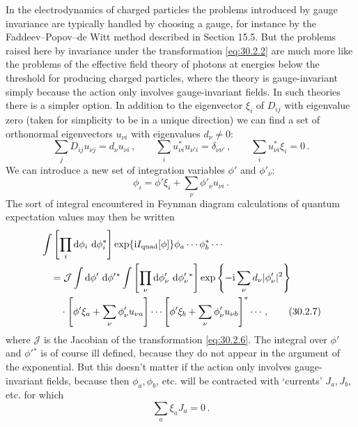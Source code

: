 In the electrodynamics of charged particles the problems introduced by gauge
invariance are typically handled by choosing a gauge, for instance by the
Faddeev--Popov--de Witt method described in Section 15.5. But the problems
raised here by invariance under the transformation \eqref{eq:30.2.2} are much
more like the problems of the effective field theory of photons at energies
below the threshold for producing charged particles, where the theory is
gauge-invariant simply because the action only involves gauge-invariant
fields. In such theories there is a simpler option. In addition to the
eigenvector \(\xi_i\) of \(D_{ij}\) with eigenvalue zero (taken for simplicity
to be in a unique direction) we can find a set of orthonormal eigenvectors
\(u_{\nu i}\) with eigenvalues \(d_\nu\neq0\):
\begin{equation}
  \sum_jD_{ij}u_{\nu j}=d_\nu u_{\nu i}\,,
  \qquad
  \sum_i u_{\nu i}^*u_{\nu'i}=\delta_{\nu\nu'}\,,
  \qquad
  \sum_i u_{\nu i}^*\xi_i=0\,.
  \tag{30.2.5}\label{eq:30.2.5}
\end{equation}
We can introduce a new set of integration variables \(\phi'\) and
\(\phi'_\nu\):
\begin{equation}
  \phi_i=\phi'\xi_i+\sum_\nu\phi'_\nu u_{\nu i}\,.
  \tag{30.2.6}\label{eq:30.2.6}
\end{equation}
The sort of integral encountered in Feynman diagram calculations of quantum
expectation values may then be written
\begin{align}
  &\int\left[\prod_i \mathop{}\!\mathrm{d}\phi_i\,\mathop{}\!\mathrm{d}\phi_i^*\right]
    \exp\{\mathrm{i} I_{\mathrm{quad}}[\phi]\}
    \phi_a\cdots\phi_b^*\cdots
  \notag\\
  &\quad={}
    \mathcal{J}\int \mathop{}\!\mathrm{d}\phi'\,\mathop{}\!\mathrm{d}\phi'{}^*
    \int\left[\prod_\nu \mathop{}\!\mathrm{d}\phi'_\nu\,\mathop{}\!\mathrm{d}\phi_\nu'{}^*\right]
    \exp\left\{-\mathrm{i}\sum_\nu d_\nu|\phi'_\nu|^2\right\}
  \notag\\
  &\qquad\cdot
    \left[\phi'\xi_a+\sum_\nu\phi'_\nu u_{\nu a}\right]\cdots
    \left[\phi'\xi_b+\sum_\nu\phi'_\nu u_{\nu b}\right]^*\cdots\,,
  \tag{30.2.7}\label{eq:30.2.7}
\end{align}
where \(\mathcal{J}\) is the Jacobian of the transformation
\eqref{eq:30.2.6}. The integral over \(\phi'\) and \(\phi'{}^*\) is of course
ill defined, because they do not appear in the argument of the exponential.
But this doesn't matter if the action only involves gauge-invariant fields,
because then \(\phi_a,\phi_b\), etc. will be contracted with `currents'
\(J_a,J_b\), etc. for which
\begin{equation}
  \sum_a\xi_aJ_a=0\,.
  \tag{30.2.8}\label{eq:30.2.8}
\end{equation}
